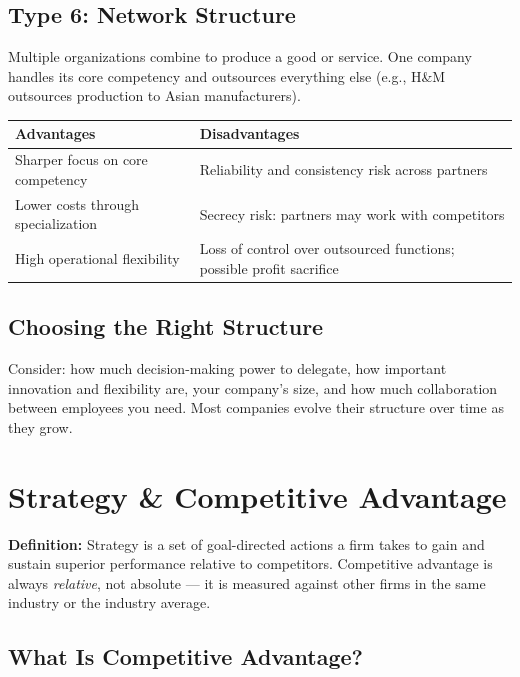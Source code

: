 \documentclass[11pt, letterpaper]{article}
\begin{document}
\subsection{Type 6: Network Structure}
Multiple organizations combine to produce a good or service. One company handles its core competency and outsources everything else (e.g., H\&M outsources production to Asian manufacturers).

\begin{center}
\begin{tabular}{p{6.5cm} p{6.5cm}}
\toprule
\textbf{Advantages} & \textbf{Disadvantages} \\
\midrule
Sharper focus on core competency & Reliability and consistency risk across partners \\
Lower costs through specialization & Secrecy risk: partners may work with competitors \\
High operational flexibility & Loss of control over outsourced functions; possible profit sacrifice \\
\bottomrule
\end{tabular}
\end{center}

\subsection{Choosing the Right Structure}
Consider: how much decision-making power to delegate, how important innovation and flexibility are, your company's size, and how much collaboration between employees you need. Most companies evolve their structure over time as they grow.

\newpage

\section{Strategy \& Competitive Advantage}

\begin{defbox}
\textbf{Definition:} Strategy is a set of goal-directed actions a firm takes to gain and sustain superior performance relative to competitors. Competitive advantage is always \textit{relative}, not absolute --- it is measured against other firms in the same industry or the industry average.
\end{defbox}

\subsection{What Is Competitive Advantage?}
\end{document}
